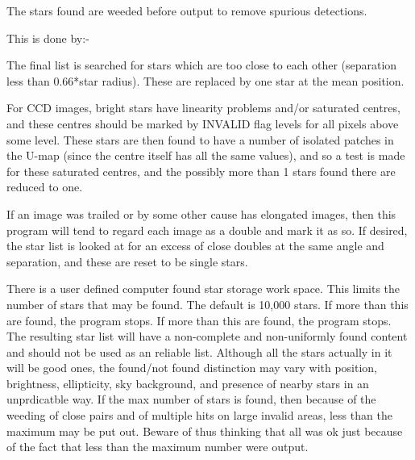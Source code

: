 \begin{small}
{{ The stars found are weeded before output to remove spurious
 detections.

 This is done by:-

\begin{list}{{-}}{}

 \item The final list is searched for stars which are too close
    to each other (separation less than 0.66*star radius). These
    are replaced by one star at the mean position.

 \item For CCD images, bright stars have linearity problems and/or
    saturated centres, and these centres should be marked by
    INVALID flag levels for all pixels above some level. These
    stars are then found to have a number of isolated patches
    in the U-map (since the centre itself has all the same values),
    and so a test is made for these saturated centres, and the
    possibly more than 1 stars found there are reduced to one.

 \item If an image was trailed or by some other cause has elongated
    images, then this program will tend to regard each image
    as a double and mark it as so. If desired, the star list
    is looked at for an excess of close doubles at the same
    angle and separation, and these are reset to be single stars.
\end{list}

 \vspace*{1mm}
 \hspace*{2em}{\bf Maximum Number}
 \vspace*{1mm}

 There is a user defined computer found star storage work space.
 This limits the number of stars that may be found. The default is
 10,000 stars. If more than this are found, the program stops.
 If more than this are found, the program stops. The resulting star
 list will have a non-complete and non-uniformly found content and
 should not be used as an reliable list. Although all the stars
 actually in it will be good ones, the found/not found distinction
 may vary with position, brightness, ellipticity, sky background,
 and presence of nearby stars in an unprdicatble way. If the
 max number of stars is found, then because of the weeding of close
 pairs and of multiple hits on large invalid areas, less than the
 maximum may be put out. Beware of thus thinking that all was ok
 just because of the fact that less than the maximum number were
 output.


}}
\end{small}
